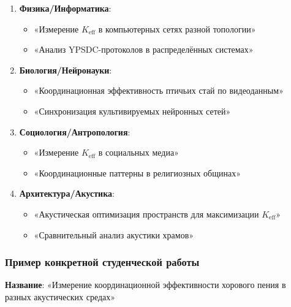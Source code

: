 \documentclass[12pt,a4paper]{article}
\begin{document}
	\begin{enumerate}
		\item \textbf{Физика/Информатика}:
		\begin{itemize}
			\item «Измерение $K_{\mathrm{eff}}$ в компьютерных сетях разной топологии»
			\item «Анализ YPSDC-протоколов в распределённых системах»
		\end{itemize}
		
		\item \textbf{Биология/Нейронауки}:
		\begin{itemize}
			\item «Координационная эффективность птичьих стай по видеоданным»
			\item «Синхронизация культивируемых нейронных сетей»
		\end{itemize}
		
		\item \textbf{Социология/Антропология}:
		\begin{itemize}
			\item «Измерение $K_{\mathrm{eff}}$ в социальных медиа»
			\item «Координационные паттерны в религиозных общинах»
		\end{itemize}
		
		\item \textbf{Архитектура/Акустика}:
		\begin{itemize}
			\item «Акустическая оптимизация пространств для максимизации $K_{\mathrm{eff}}$»
			\item «Сравнительный анализ акустики храмов»
		\end{itemize}
	\end{enumerate}
	
	\subsubsection{Пример конкретной студенческой работы}
	
	\textbf{Название}: «Измерение координационной эффективности хорового пения в разных акустических средах»
	
\end{document}
